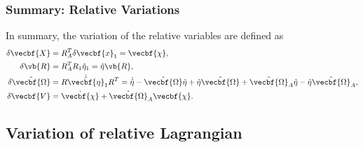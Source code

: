 \documentclass[11pt, reqno]{article}    %
\begin{document}
\subsubsection{Summary: Relative Variations}
In summary, the variation of the relative variables are defined as
\begin{align*}
    \delta \vecbf{X} &= R_A^T \delta \vecbf{x}_1 = \vecbf{\chi} , \\
    \delta \vb{R} &= R_A^T R_1 \hat{\eta}_1 = \hat{\eta} \vb{R} ,\\
    \delta \hat{\vecbf{\Omega}} &= R \dot{\hat{\vecbf{\eta}}}_1 R^T = \dot{\hat{\eta}} - \hat{\vecbf{\Omega}} \hat{\eta} + \hat{\eta} \hat{\vecbf{\Omega}} +  \hat{\vecbf{\Omega}}_A \hat{\eta} - \hat{\eta} \hat{\vecbf{\Omega}}_A , \\
    \delta \vecbf{V} &= \dot{\vecbf{\chi}} + \hat{\vecbf{\Omega}}_A \vecbf{\chi} .
\end{align*}
\subsection{Variation of relative Lagrangian}\label{ssec:var_rel_lagrangian}
\end{document}

